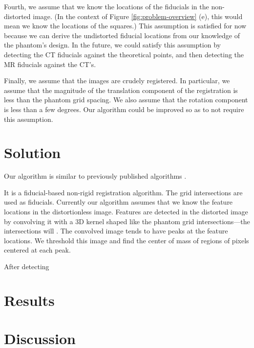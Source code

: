 \documentclass[12pt]{article}
\begin{document}
Fourth, we assume that we know the locations of the fiducials in the non-distorted image.  (In the context of Figure \ref{fig:problem-overview} (e), this would mean we know the locations of the squares.)  This assumption is satisfied for now because we can derive the undistorted fiducial locations from our knowledge of the phantom's design.  In the future, we could satisfy this assumption by detecting the CT fiducials against the theoretical points, and then detecting the MR fiducials against the CT's.

Finally, we assume that the images are crudely registered.  In particular, we assume that the magnitude of the translation component of the registration is less than the phantom grid spacing.  We also assume that the rotation component is less than a few degrees.  Our algorithm could be improved so as to not require this assumption.

\section*{Solution}
Our algorithm is similar to previously published algorithms \cite{stanescu2010,baldwin2007}.

It is a fiducial-based non-rigid registration algorithm.  The grid intersections are used as fiducials.  Currently our algorithm assumes that we know the feature locations in the distortionless image.  Features are detected in the distorted image by convolving it with a 3D kernel shaped like the phantom grid intersections---the intersections will .  The convolved image tends to have peaks at the feature locations.  We threshold this  image and find the center of mass of regions of pixels centered at each peak.

After detecting 

\section*{Results}

\section*{Discussion}



\end{document}
